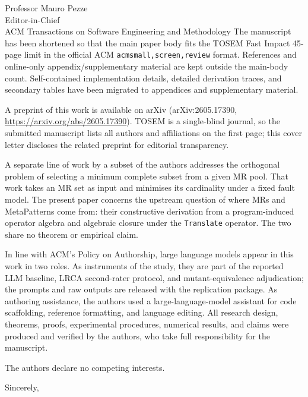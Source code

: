 \documentclass[11pt]{letter}
\begin{document}
\begin{letter}{Professor Mauro Pezze\\
Editor-in-Chief\\
ACM Transactions on Software Engineering and Methodology}
The manuscript has been shortened so that the main paper body fits the TOSEM Fast Impact 45-page limit in the official ACM \texttt{acmsmall,screen,review} format. References and online-only appendix/supplementary material are kept outside the main-body count. Self-contained implementation details, detailed derivation traces, and secondary tables have been migrated to appendices and supplementary material.

A preprint of this work is available on arXiv (arXiv:2605.17390, \url{https://arxiv.org/abs/2605.17390}). TOSEM is a single-blind journal, so the submitted manuscript lists all authors and affiliations on the first page; this cover letter discloses the related preprint for editorial transparency.

A separate line of work by a subset of the authors addresses the orthogonal problem of selecting a minimum complete subset from a given MR pool. That work takes an MR set as input and minimises its cardinality under a fixed fault model. The present paper concerns the upstream question of where MRs and MetaPatterns come from: their constructive derivation from a program-induced operator algebra and algebraic closure under the \texttt{Translate} operator. The two share no theorem or empirical claim.

In line with ACM's Policy on Authorship, large language models appear in this work in two roles. As instruments of the study, they are part of the reported LLM baseline, LRCA second-rater protocol, and mutant-equivalence adjudication; the prompts and raw outputs are released with the replication package. As authoring assistance, the authors used a large-language-model assistant for code scaffolding, reference formatting, and language editing. All research design, theorems, proofs, experimental procedures, numerical results, and claims were produced and verified by the authors, who take full responsibility for the manuscript.

The authors declare no competing interests.

\closing{Sincerely,}

\end{letter}
\end{document}
